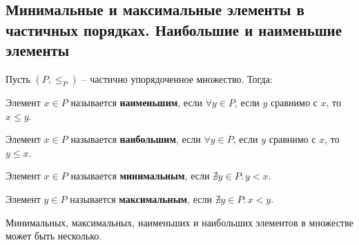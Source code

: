 \subsection{Минимальные и максимальные элементы в частичных порядках. Наибольшие и наименьшие элементы}

Пусть $(P, \le_P)$ -- частично упорядоченное множество. Тогда:

Элемент $x \in P$ называется \textbf{наименьшим}, если $\forall y \in P$, если $y$ сравнимо с $x$, то $x \le y$.

Элемент $x \in P$ называется \textbf{наибольшим}, если $\forall y \in P$, если $y$ сравнимо с $x$, то $y \le x$.

Элемент $x \in P$ называется \textbf{минимальным}, если $\nexists y \in P: y < x$.

Элемент $y \in P$ называется \textbf{максимальным}, если $\nexists y \in P: x < y$.

Минимальных, максимальных, наименьших и наибольших элементов в множестве может быть несколько.
